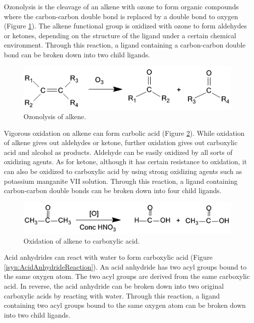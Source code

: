 Ozonolysis is the cleavage of an alkene with ozone to form organic compounds where the carbon-carbon double bond is replaced by a double bond to oxygen (Figure \ref{isyn:AlkeneOzonolysis}). The alkene functional group is oxidized with ozone to form aldehydes or ketones, depending on the structure of the ligand under a certain chemical environment. Through this reaction, a ligand containing a carbon-carbon double bond can be broken down into two child ligands.
 
\begin{figure}
\begin{center}
\includegraphics[width=\linewidth]{../isyn/AlkeneOzonolysis.png}
\end{center}
\caption{Ozonolysis of alkene.}
\label{isyn:AlkeneOzonolysis}
\end{figure}

Vigorous oxidation on alkene can form carbolic acid (Figure \ref{isyn:AlkeneOxidation}). While oxidation of alkene gives out aldehydes or ketone, further oxidation gives out carboxylic acid and alcohol as products. Aldehyde can be easily oxidized by all sorts of oxidizing agents. As for ketone, although it has certain resistance to oxidation, it can also be oxidized to carboxylic acid by using strong oxidizing agents such as potassium manganite VII solution. Through this reaction, a ligand containing carbon-carbon double bonds can be broken down into four child ligands.
 
\begin{figure}
\begin{center}
\includegraphics[width=\linewidth]{../isyn/AlkeneOxidation.png}
\end{center}
\caption{Oxidation of alkene to carboxylic acid.}
\label{isyn:AlkeneOxidation}
\end{figure}

Acid anhydrides can react with water to form carboxylic acid (Figure \ref{isyn:AcidAnhydrideReaction}). An acid anhydride has two acyl groups bound to the same oxygen atom. The two acyl groups are derived from the same carboxylic acid. In reverse, the acid anhydride can be broken down into two original carboxylic acids by reacting with water. Through this reaction, a ligand containing two acyl groups bound to the same oxygen atom can be broken down into two child ligands.

